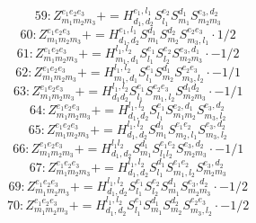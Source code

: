 \documentclass[letterpaper,10pt,fleqn,leqno,onecolumn]{article}
\begin{document}
\begin{equation} \;\;\;\;\;\;  59: Z^{e_{1}e_{2}e_{3}}_{m_{1}m_{2}m_{3}}+=H^{e_{1},l_{1}}_{d_{1},d_{2}}S^{e_{2}}_{l_{1}}S^{d_{1}}_{m_{1}}S^{e_{3},d_{2}}_{m_{2}m_{3}} \end{equation}
\begin{equation} \;\;\;\;\;\;  60: Z^{e_{1}e_{2}e_{3}}_{m_{1}m_{2}m_{3}}+=H^{e_{1},l_{1}}_{d_{1},d_{2}}S^{d_{1}}_{m_{1}}S^{d_{2}}_{m_{2}}S^{e_{2}e_{3}}_{m_{3},l_{1}}\cdot 1/2 \end{equation}
\begin{equation} \;\;\;\;\;\;  61: Z^{e_{1}e_{2}e_{3}}_{m_{1}m_{2}m_{3}}+=H^{l_{1},l_{2}}_{m_{1},d_{1}}S^{e_{1}}_{l_{1}}S^{e_{2}}_{l_{2}}S^{e_{3},d_{1}}_{m_{2}m_{3}}\cdot -1/2 \end{equation}
\begin{equation} \;\;\;\;\;\;  62: Z^{e_{1}e_{2}e_{3}}_{m_{1}m_{2}m_{3}}+=H^{l_{1},l_{2}}_{m_{1},d_{1}}S^{e_{1}}_{l_{1}}S^{d_{1}}_{m_{2}}S^{e_{2}e_{3}}_{m_{3},l_{2}}\cdot -1/1 \end{equation}
\begin{equation} \;\;\;\;\;\;  63: Z^{e_{1}e_{2}e_{3}}_{m_{1}m_{2}m_{3}}+=H^{l_{1},l_{2}}_{d_{1}d_{2}}S^{e_{1}}_{l_{1}}S^{e_{2}e_{3}}_{m_{1},l_{2}}S^{d_{1}d_{2}}_{m_{2}m_{3}}\cdot -1/1 \end{equation}
\begin{equation} \;\;\;\;\;\;  64: Z^{e_{1}e_{2}e_{3}}_{m_{1}m_{2}m_{3}}+=H^{l_{1},l_{2}}_{d_{1},d_{2}}S^{e_{1}}_{l_{1}}S^{e_{2},d_{1}}_{m_{1}m_{2}}S^{e_{3},d_{2}}_{m_{3},l_{2}} \end{equation}
\begin{equation} \;\;\;\;\;\;  65: Z^{e_{1}e_{2}e_{3}}_{m_{1}m_{2}m_{3}}+=H^{l_{1},l_{2}}_{d_{1},d_{2}}S^{d_{1}}_{m_{1}}S^{e_{1}e_{2}}_{m_{2},l_{1}}S^{e_{3},d_{2}}_{m_{3},l_{2}} \end{equation}
\begin{equation} \;\;\;\;\;\;  66: Z^{e_{1}e_{2}e_{3}}_{m_{1}m_{2}m_{3}}+=H^{l_{1}l_{2}}_{d_{1},d_{2}}S^{d_{1}}_{m_{1}}S^{e_{1}e_{2}}_{l_{1}l_{2}}S^{e_{3},d_{2}}_{m_{2}m_{3}}\cdot -1/1 \end{equation}
\begin{equation} \;\;\;\;\;\;  67: Z^{e_{1}e_{2}e_{3}}_{m_{1}m_{2}m_{3}}+=H^{l_{1},l_{2}}_{d_{1},d_{2}}S^{d_{1}}_{l_{1}}S^{e_{1}e_{2}}_{m_{1},l_{2}}S^{e_{3},d_{2}}_{m_{2}m_{3}} \end{equation}
\begin{equation} \;\;\;\;\;\;  69: Z^{e_{1}e_{2}e_{3}}_{m_{1}m_{2}m_{3}}+=H^{l_{1},l_{2}}_{d_{1},d_{2}}S^{e_{1}}_{l_{1}}S^{e_{2}}_{l_{2}}S^{d_{1}}_{m_{1}}S^{e_{3},d_{2}}_{m_{2}m_{3}}\cdot -1/2 \end{equation}
\begin{equation} \;\;\;\;\;\;  70: Z^{e_{1}e_{2}e_{3}}_{m_{1}m_{2}m_{3}}+=H^{l_{1},l_{2}}_{d_{1},d_{2}}S^{e_{1}}_{l_{1}}S^{d_{1}}_{m_{1}}S^{d_{2}}_{m_{2}}S^{e_{2}e_{3}}_{m_{3},l_{2}}\cdot -1/2 \end{equation}
\end{document}
